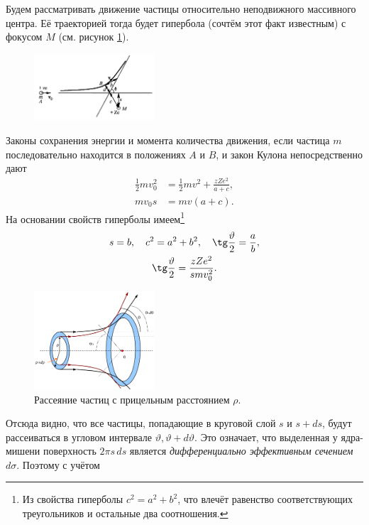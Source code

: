 Будем рассматривать движение частицы относительно неподвижного массивного
центра. Её траекторией тогда будет гипербола (сочтём этот факт известным) с фокусом $ M $ (см. рисунок
\ref{fig:reser1}).
\begin{figure}
	\centering
	\includegraphics[width=0.4\textwidth]{img/oral-05/reser1.png}
  \caption{}
  \label{fig:reser1}
\end{figure}
Законы сохранения энергии и момента количества движения, если частица $ m $
последовательно находится в положениях $ A $ и $ B $, и закон Кулона непосредственно дают 
\begin{align*}
  \frac{1}{2} mv_0^2 &= \frac{1}{2}mv^2 + \frac{zZe^2}{a+c},\\
    mv_0s&=mv(a+c).
\end{align*}
На основании свойств гиперболы имеем\footnote{Из свойства гиперболы $ c^2 = a^2
  + b^2$, что влечёт равенство соответствующих треугольников и остальные два
соотношения.}
\begin{gather*}
    s = b, \quad c^2=a^2+b^2, \quad \tg \frac{\vartheta}{2} = \frac{a}{b},\\
    \tg \frac{\vartheta}{2} = \frac{zZe^2}{smv_0^2}.
\end{gather*}
\begin{figure}
	\centering
	\includegraphics[width=0.4\textwidth]{img/oral-05/reser2.png}
  \caption{Рассеяние частиц с прицельным расстоянием $ \rho $.}
  \label{fig:reser2}
\end{figure}
Отсюда видно, что все частицы, попадающие в круговой слой $s $ и
$s + ds$, будут рассеиваться в угловом интервале $ \vartheta, \vartheta+d\vartheta $. Это
означает, что выделенная у ядра-мишени поверхность $ 2\pi s\,ds $ является
\emph{дифференциально эффективным сечением $ d\sigma $}. Поэтому с учётом  
